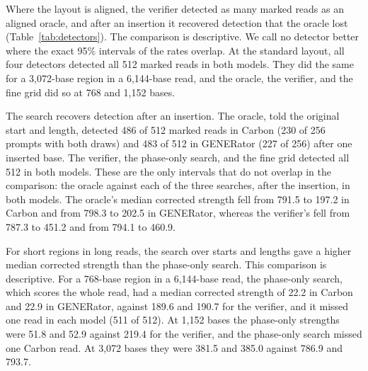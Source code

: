 \documentclass[10pt,twocolumn]{article}
\begin{document}
Where the layout is aligned, the verifier detected as many marked reads as an aligned oracle, and
after an insertion it recovered detection that the oracle lost (Table~\ref{tab:detectors}). The
comparison is descriptive. We call no detector better where the exact 95\% intervals of the rates
overlap. At the standard layout, all four detectors detected all 512 marked reads in both models.
They did the same for a 3{,}072-base region in a 6{,}144-base read, and the oracle, the verifier, and
the fine grid did so at 768 and 1{,}152 bases.

\begin{table}[tp]
\centering
\caption{Four detectors on five settings in the local cohort, 256 prompts and 512 reads per model.
\textit{Windows} is the number of windows searched per read. \textit{Marked} and \textit{Ordinary}
are the marked reads detected and the ordinary reads flagged, both of 512. \textit{Strength} is the
median corrected strength of marked reads, $-\log_{10}$ of the sequence-level $P$-value, and a read
is positive at 2 or more. \textit{ms} is the median single-thread time per read on the local
machine; it is not comparable with the timing on a different processor in
Supplementary Section~\ref{supp:cost}. Supplementary Table~\ref{tab:detectors-prompts} gives the
prompt-level counts and bounds.}
\label{tab:detectors}
\small
\setlength{\tabcolsep}{4pt}
\renewcommand{\arraystretch}{1.08}

\end{table}

The search recovers detection after an insertion. The oracle, told the original start and length,
detected 486 of 512 marked reads in Carbon (230 of 256 prompts with both draws) and 483 of 512 in
GENERator (227 of 256) after one inserted base. The verifier, the phase-only search, and the fine
grid detected all 512 in both models. These are the only intervals that do not overlap in the
comparison: the oracle against each of the three searches, after the insertion, in both models. The
oracle's median corrected strength fell from 791.5 to 197.2 in Carbon and from 798.3 to 202.5 in
GENERator, whereas the verifier's fell from 787.3 to 451.2 and from 794.1 to 460.9.

For short regions in long reads, the search over starts and lengths gave a higher median corrected
strength than the phase-only search. This comparison is descriptive. For a 768-base
region in a 6{,}144-base read, the phase-only search, which scores the whole read, had a median
corrected strength of 22.2 in Carbon and 22.9 in GENERator, against 189.6 and 190.7 for the
verifier, and it missed one read in each model (511 of 512). At 1{,}152 bases the phase-only
strengths were 51.8 and 52.9 against 219.4 for the verifier, and the phase-only search missed one
Carbon read. At 3{,}072 bases they were 381.5 and 385.0 against 786.9 and 793.7.
\end{document}
